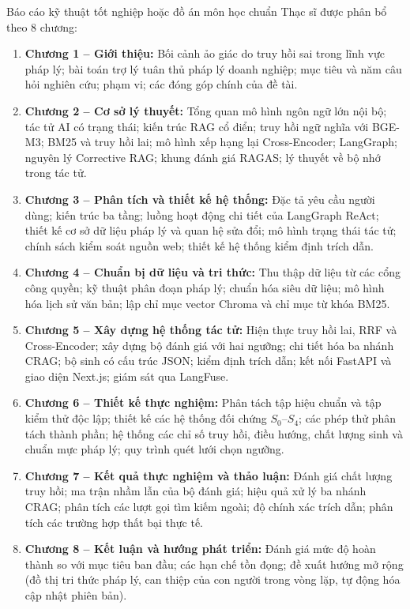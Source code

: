Báo cáo kỹ thuật tốt nghiệp hoặc đồ án môn học chuẩn Thạc sĩ được phân bổ theo 8 chương:
\begin{enumerate}
    \item \textbf{Chương 1 -- Giới thiệu:} Bối cảnh ảo giác do truy hồi sai trong lĩnh vực pháp lý; bài toán trợ lý tuân thủ pháp lý doanh nghiệp; mục tiêu và năm câu hỏi nghiên cứu; phạm vi; các đóng góp chính của đề tài.
    \item \textbf{Chương 2 -- Cơ sở lý thuyết:} Tổng quan mô hình ngôn ngữ lớn nội bộ; tác tử AI có trạng thái; kiến trúc RAG cổ điển; truy hồi ngữ nghĩa với BGE-M3; BM25 và truy hồi lai; mô hình xếp hạng lại Cross-Encoder; LangGraph; nguyên lý Corrective RAG; khung đánh giá RAGAS; lý thuyết về bộ nhớ trong tác tử.
    \item \textbf{Chương 3 -- Phân tích và thiết kế hệ thống:} Đặc tả yêu cầu người dùng; kiến trúc ba tầng; luồng hoạt động chi tiết của LangGraph ReAct; thiết kế cơ sở dữ liệu pháp lý và quan hệ sửa đổi; mô hình trạng thái tác tử; chính sách kiểm soát nguồn web; thiết kế hệ thống kiểm định trích dẫn.
    \item \textbf{Chương 4 -- Chuẩn bị dữ liệu và tri thức:} Thu thập dữ liệu từ các cổng công quyền; kỹ thuật phân đoạn pháp lý; chuẩn hóa siêu dữ liệu; mô hình hóa lịch sử văn bản; lập chỉ mục vector Chroma và chỉ mục từ khóa BM25.
    \item \textbf{Chương 5 -- Xây dựng hệ thống tác tử:} Hiện thực truy hồi lai, RRF và Cross-Encoder; xây dựng bộ đánh giá với hai ngưỡng; chi tiết hóa ba nhánh CRAG; bộ sinh có cấu trúc JSON; kiểm định trích dẫn; kết nối FastAPI và giao diện Next.js; giám sát qua LangFuse.
    \item \textbf{Chương 6 -- Thiết kế thực nghiệm:} Phân tách tập hiệu chuẩn và tập kiểm thử độc lập; thiết kế các hệ thống đối chứng $S_0$--$S_4$; các phép thử phân tách thành phần; hệ thống các chỉ số truy hồi, điều hướng, chất lượng sinh và chuẩn mực pháp lý; quy trình quét lưới chọn ngưỡng.
    \item \textbf{Chương 7 -- Kết quả thực nghiệm và thảo luận:} Đánh giá chất lượng truy hồi; ma trận nhầm lẫn của bộ đánh giá; hiệu quả xử lý ba nhánh CRAG; phân tích các lượt gọi tìm kiếm ngoài; độ chính xác trích dẫn; phân tích các trường hợp thất bại thực tế.
    \item \textbf{Chương 8 -- Kết luận và hướng phát triển:} Đánh giá mức độ hoàn thành so với mục tiêu ban đầu; các hạn chế tồn đọng; đề xuất hướng mở rộng (đồ thị tri thức pháp lý, can thiệp của con người trong vòng lặp, tự động hóa cập nhật phiên bản).
\end{enumerate}
